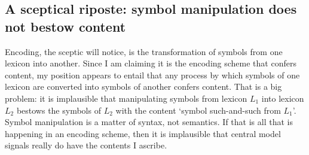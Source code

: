 

\subsection{A sceptical riposte: symbol manipulation does not bestow content}

Encoding, the sceptic will notice, is the transformation of symbols from one lexicon into another.
Since I am claiming it is the encoding scheme that confers content, my position appears to entail that any process by which symbols of one lexicon are converted into symbols of another confers content.
That is a big problem: it is implausible that manipulating symbols from lexicon $L_1$ into lexicon $L_2$ bestows the symbols of $L_2$ with the content `symbol such-and-such from $L_1$'.
Symbol manipulation is a matter of syntax, not semantics.
If that is all that is happening in an encoding scheme, then it is implausible that central model signals really do have the contents I ascribe.

